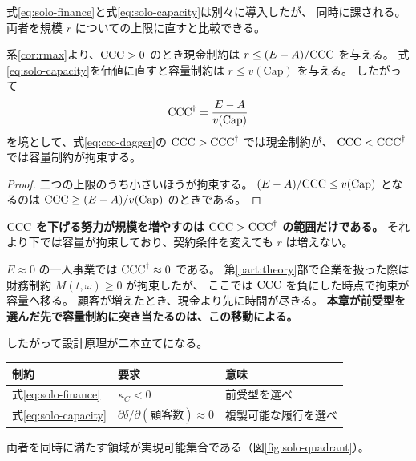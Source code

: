 式\eqref{eq:solo-finance}と式\eqref{eq:solo-capacity}は別々に導入したが、
同時に課される。両者を規模 $r$ についての上限に直すと比較できる。

\begin{proposition}[拘束の入れ替わり]
\label{prop:binding-switch}
系\ref{cor:rmax}より、$\mathrm{CCC}>0$ のとき現金制約は $r\leq(E-A)/\mathrm{CCC}$ を与える。
式\eqref{eq:solo-capacity}を価値に直すと容量制約は $r\leq v(\mathrm{Cap})$ を与える。
したがって
\begin{equation}
\mathrm{CCC}^{\dagger} = \frac{E-A}{v(\mathrm{Cap})}
\label{eq:ccc-dagger}
\end{equation}
を境として、式\eqref{eq:ccc-dagger}の $\mathrm{CCC}>\mathrm{CCC}^{\dagger}$ では現金制約が、
$\mathrm{CCC}<\mathrm{CCC}^{\dagger}$ では容量制約が拘束する。
\end{proposition}

\begin{proof}
二つの上限のうち小さいほうが拘束する。
$(E-A)/\mathrm{CCC} \leq v(\mathrm{Cap})$ となるのは $\mathrm{CCC}\geq(E-A)/v(\mathrm{Cap})$ のときである。
\end{proof}

\textbf{$\mathrm{CCC}$ を下げる努力が規模を増やすのは $\mathrm{CCC}>\mathrm{CCC}^{\dagger}$ の範囲だけである。}
それより下では容量が拘束しており、契約条件を変えても $r$ は増えない。

$E\approx 0$ の一人事業では $\mathrm{CCC}^{\dagger}\approx 0$ である。
第\ref{part:theory}部で企業を扱った際は財務制約 $M(t,\omega)\geq 0$ が拘束したが、
ここでは $\mathrm{CCC}$ を負にした時点で拘束が容量へ移る。
顧客が増えたとき、現金より先に時間が尽きる。
\textbf{本章が前受型を選んだ先で容量制約に突き当たるのは、この移動による。}

したがって設計原理が二本立てになる。

\begin{center}
\begin{tabularx}{\textwidth}{@{}llX@{}}
\toprule
制約 & 要求 & 意味 \\
\midrule
式\eqref{eq:solo-finance} & $\kappa_C < 0$ & 前受型を選べ \\
式\eqref{eq:solo-capacity} & $\partial\delta/\partial(\text{顧客数})\approx 0$ & 複製可能な履行を選べ \\
\bottomrule
\end{tabularx}
\label{tab:solo-constraint-design}
\end{center}

両者を同時に満たす領域が実現可能集合である（図\ref{fig:solo-quadrant}）。

